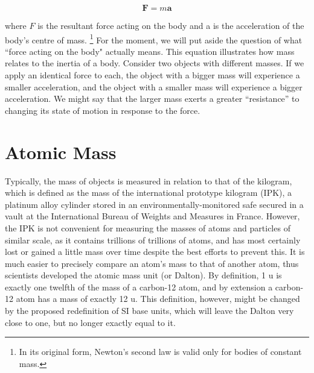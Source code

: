 \documentclass{book}
\begin{document}
	\begin{equation}
		{\displaystyle \mathbf {F} =m\mathbf {a}} \nonumber
	\end{equation}
	
	where $F$ is the resultant force acting on the body and a is the acceleration of the body's centre of mass. \footnote{ In its original form, Newton's second law is valid only for bodies of constant mass.} For the moment, we will put aside the question of what ``force acting on the body" actually means. This equation illustrates how mass relates to the inertia of a body. Consider two objects with different masses. If we apply an identical force to each, the object with a bigger mass will experience a smaller acceleration, and the object with a smaller mass will experience a bigger acceleration. We might say that the larger mass exerts a greater ``resistance'' to changing its state of motion in response to the force.
	
	\section{Atomic Mass}
	Typically, the mass of objects is measured in relation to that of the kilogram, which is defined as the mass of the international prototype kilogram (IPK), a platinum alloy cylinder stored in an environmentally-monitored safe secured in a vault at the International Bureau of Weights and Measures in France. However, the IPK is not convenient for measuring the masses of atoms and particles of similar scale, as it contains trillions of trillions of atoms, and has most certainly lost or gained a little mass over time despite the best efforts to prevent this. It is much easier to precisely compare an atom's mass to that of another atom, thus scientists developed the atomic mass unit (or Dalton). By definition, 1 u is exactly one twelfth of the mass of a carbon-12 atom, and by extension a carbon-12 atom has a mass of exactly 12 u. This definition, however, might be changed by the proposed redefinition of SI base units, which will leave the Dalton very close to one, but no longer exactly equal to it.
	
\end{document}

